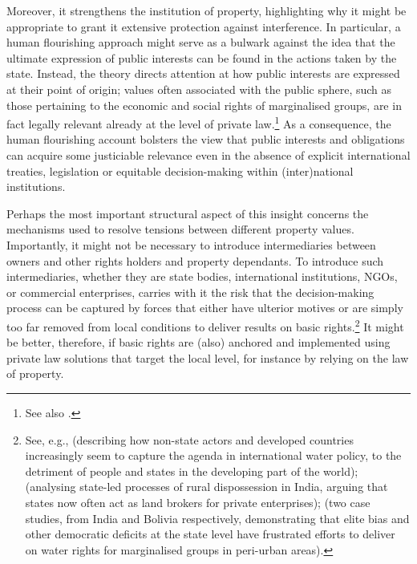 Moreover, it strengthens the institution of property, highlighting why it might be appropriate to 
grant it extensive protection against interference. In particular, a human flourishing approach might serve as a bulwark against the idea that the ultimate expression of public interests can be found in the actions taken by the state. Instead, the theory directs attention at how public interests are expressed at their point of origin; values often associated with the public sphere, such as those pertaining to the economic and social rights of marginalised groups, are in fact legally relevant already at the level of private law.\footnote{See also \cite[1295-1296]{alexander14}.} As a consequence, the human flourishing account bolsters the view that public interests and obligations can acquire some justiciable relevance even in the absence of explicit international treaties, legislation or equitable decision-making within (inter)national institutions. 

Perhaps the most important structural aspect of this insight concerns the mechanisms used to resolve tensions between different property values. Importantly, it might not be necessary to introduce intermediaries between owners and other rights holders and property dependants. To introduce such intermediaries, whether they are state bodies, international institutions, NGOs, or commercial enterprises, carries with it the risk that the decision-making process can be captured by forces that either have ulterior motives or are simply too far removed from local conditions to deliver results on basic rights.\footnote{See, e.g., \cite{cullet13} (describing how non-state actors and developed countries increasingly seem to capture the agenda in international water policy, to the detriment of people and states in the developing part of the world); \cite{levien13} (analysing state-led processes of rural dispossession in India, arguing that states now often act as land brokers for private enterprises); \cite{mehta14} (two case studies, from India and Bolivia respectively, demonstrating that elite bias and other democratic deficits at the state level have frustrated efforts to deliver on water rights for marginalised groups in peri-urban areas).} It might be better, therefore, if basic rights are (also) anchored and implemented using private law solutions that target the local level, for instance by relying on the law of property.


